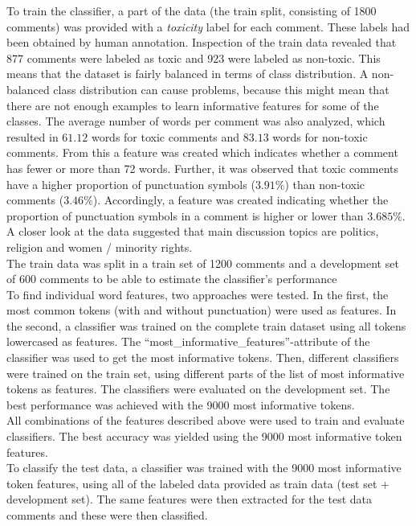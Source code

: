 \documentclass[11pt,a4paper]{article}
\begin{document}
To train the classifier, a part of the data (the train split, consisting of 1800 comments) was provided with a \textit{toxicity} label for each comment. These labels had been obtained by human annotation. Inspection of the train data revealed that 877 comments were labeled as toxic and 923 were labeled as non-toxic. This means that the dataset is fairly balanced in terms of class distribution. A non-balanced class distribution can cause problems, because this might mean that there are not enough examples to learn informative features for some of the classes. The average number of words per comment was also analyzed, which resulted in $61.12$ words for toxic comments and $83.13$ words for non-toxic comments. From this a feature was created which indicates whether a comment has fewer or more than 72 words. Further, it was observed that toxic comments have a higher proportion of punctuation symbols ($3.91\%$) than non-toxic comments ($3.46\%$). Accordingly, a feature was created indicating whether the proportion of punctuation symbols in a comment is higher or lower than $3.685\%$. A closer look at the data suggested that main discussion topics are politics, religion and women / minority rights. \\
The train data was split in a train set of 1200 comments and a development set of 600 comments to be able to estimate the classifier's performance\\
To find individual word features, two approaches were tested. In the first, the most common tokens (with and without punctuation) were used as features. In the second, a classifier was trained on the complete train dataset using all tokens lowercased as features. The ``most\_informative\_features''-attribute of the classifier was used to get the most informative tokens. Then, different classifiers were trained on the train set, using different parts of the list of most informative tokens as features. The classifiers were evaluated on the development set. The best performance was achieved with the 9000 most informative tokens.\\
All combinations of the features described above were used to train and evaluate classifiers. The best accuracy was yielded using the 9000 most informative token features. \\
To classify the test data, a classifier was trained with the 9000 most informative token features, using all of the labeled data provided as train data (test set + development set). The same features were then extracted for the test data comments and these were then classified.\\
\end{document}
